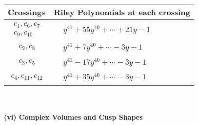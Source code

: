 \documentclass[1p]{elsarticle_modified}
\theoremstyle{definition}
\begin{document}
\begin{tabular}{m{50pt}|m{274pt}}
Crossings & \hspace{64pt}Riley Polynomials at each crossing \\
\hline $$\begin{aligned}c_{1},c_{6},c_{7}\\c_{9},c_{10}\end{aligned}$$&$\begin{aligned}
&y^{41}+55 y^{40}+\cdots+21 y-1
\end{aligned}$\\
\hline $$\begin{aligned}c_{2},c_{8}\end{aligned}$$&$\begin{aligned}
&y^{41}+7 y^{40}+\cdots-3 y-1
\end{aligned}$\\
\hline $$\begin{aligned}c_{3},c_{5}\end{aligned}$$&$\begin{aligned}
&y^{41}-17 y^{40}+\cdots-3 y-1
\end{aligned}$\\
\hline $$\begin{aligned}c_{4},c_{11},c_{12}\end{aligned}$$&$\begin{aligned}
&y^{41}+35 y^{40}+\cdots-3 y-1
\end{aligned}$\\
\hline
\end{tabular}\\~\\
\newpage\flushleft \textbf{(vi) Complex Volumes and Cusp Shapes}
\end{document}
